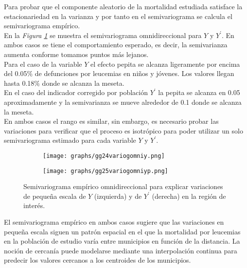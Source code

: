 \documentclass[11pt, oneside]{book}
\begin{document}
Para probar que el componente aleatorio de la mortalidad estudiada satisface la estacionariedad en la varianza y por tanto en el semivariograma se calcula el semivariograma empírico.\\

En la \emph{Figura \ref{fig12.varomn}} se muestra el semivariograma omnidireccional para $Y$ y $Y^{'}$. En ambos casos se tiene el comportamiento esperado, es decir,  la semivarianza aumenta conforme tomamos puntos más lejanos.\\ 

Para el caso de la variable $Y$ el efecto pepita se alcanza ligeramente por encima del 0.05\% de defunciones por leucemias en niños y jóvenes. Los valores llegan hasta 0.18\% donde se alcanza la meseta.\\

En el caso del indicador corregido por población $Y^{'}$ la pepita se alcanza en 0.05 aproximadamente y la semivarianza se mueve alrededor de 0.1 donde se alcanza la meseta.\\

En ambos casos el rango es similar, sin embargo, es necesario probar las variaciones para verificar que el proceso es isotrópico para poder utilizar un solo semivariograma estimado para cada variable $Y$ y $Y^{'}$.\\

  \begin{figure}[!ht]
  	\begin{subfigure}{.5\textwidth}
  	  \centering
  	  \texttt{[image: graphs/gg24variogomniy.png]}
  	\end{subfigure}%
  	\begin{subfigure}{.5\textwidth}
  	  \centering
      \texttt{[image: graphs/gg25variogomniyp.png]}
  	\end{subfigure}
  \caption{Semivariograma empírico omnidireccional para explicar variaciones de pequeña escala de $Y$ (izquierda) y de $Y^{'}$ (derecha) en la región de interés.}
  \label{fig12.varomn}
  \end{figure}

El semivariograma empírico en ambos casos sugiere que las variaciones en pequeña escala siguen un patrón espacial en el que la mortalidad por leucemias en la población de estudio varía entre municipios en función de la distancia. La noción de cercanía puede modelarse mediante una interpolación continua para predecir los valores cercanos a los centroides de los municipios.\\
\end{document}
